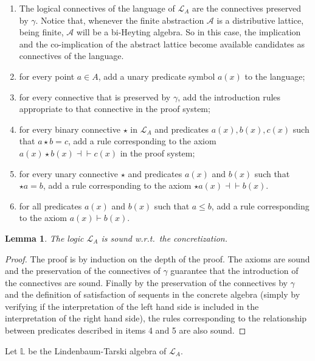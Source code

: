 \documentclass[11pt]{article}
\theoremstyle{plain}
\newtheorem{lem}[thm]{Lemma}
\theoremstyle{definition}
\begin{document}
\begin{enumerate}
	\item The logical connectives of the language of $\mathcal{L}_A$ are the connectives preserved by $\gamma$. Notice that, whenever the finite abstraction $\mathcal{A}$ is a distributive lattice,  being  finite, $\mathcal{A}$ will be a bi-Heyting algebra. So in this case, the implication and the co-implication of the abstract lattice  become available candidates as connectives of the language.
	\item for every point $a\in A$,  add a unary predicate symbol $a(x)$ to the language; 
	\item for every connective that is preserved by $\gamma$, add  the introduction rules appropriate to that connective in the proof system;
	\item for every binary connective  $\star$ in $\mathcal{L}_A$ and predicates $a(x),b(x),c(x)$ such that $a\star b=c$,  add a rule corresponding to the axiom $a(x)\star b(x)\dashv\vdash c(x)$ in the proof system;
	\item for every unary connective $\star$ and predicates $a(x)$ and $b(x)$ such that $\star a=b$,  add a rule corresponding to the axiom $\star a(x)\dashv\vdash b(x)$.
	\item for all predicates $a(x)$ and $b(x)$ such that $a\leq b$,  add a rule corresponding to the axiom $a(x)\vdash b(x)$.
\end{enumerate}

\begin{lem}
	The logic $\mathcal{L}_A$ is sound w.r.t.\ the concretization.
\end{lem}
\begin{proof}
	The proof is by induction on the depth of the proof. The axioms are sound and the preservation of the connectives of $\gamma$ guarantee that the introduction of the connectives are sound. Finally by the preservation of the connectives by $\gamma$ and the definition of satisfaction of sequents in the concrete algebra (simply by verifying if the interpretation of the left hand side is included in the interpretation of the right hand side), the rules corresponding to the relationship between predicates described in items 4 and 5 are also sound.
\end{proof}

Let $\mathbb{L}$ be the Lindenbaum-Tarski algebra of $\mathcal{L}_A$.
\end{document}
